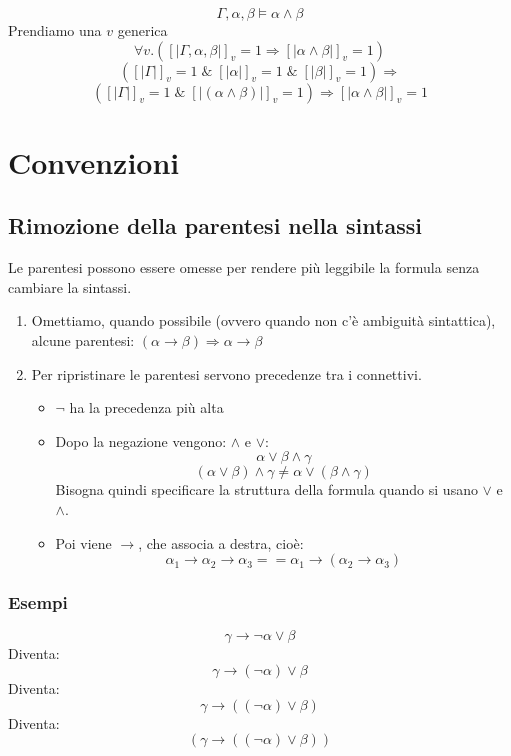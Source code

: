 \documentclass{article}
\theoremstyle{break}
\theoremstyle{break}
\theoremstyle{break}
\theoremstyle{break}
\begin{document}
\begin{exercise}
	\[
		\Gamma, \alpha, \beta \models \alpha \wedge \beta
	\]
	Prendiamo una \( v \) generica
	\[
		\forall v. ([|\Gamma, \alpha, \beta|]_v=1 \Rightarrow [|\alpha \wedge \beta|]_v=1)
	\]
	\[
		([|\Gamma|]_v=1\; \&\; [|\alpha|]_v=1\; \&\; [|\beta|]_v=1) \Rightarrow
	\]
	\[
		([|\Gamma|]_v=1\; \&\; [|(\alpha \wedge \beta)|]_v=1) \Rightarrow [|\alpha \wedge \beta|]_v=1
	\]
\end{exercise}


\section{Convenzioni}
\subsection{Rimozione della parentesi nella sintassi}
Le parentesi possono essere omesse per rendere più leggibile la formula senza cambiare
la sintassi.
\begin{enumerate}
    \item Omettiamo, quando possibile (ovvero quando non c'è ambiguità sintattica),
        alcune parentesi: \( (\alpha \to \beta) \Rightarrow \alpha \to \beta \) 
        \item Per ripristinare le parentesi servono precedenze tra i connettivi.
            \begin{itemize}
                \item \( \neg \) ha la precedenza più alta
                    \item Dopo la negazione vengono: \( \wedge \) e \( \vee \):
                        \[
                        \alpha \vee \beta \wedge \gamma
                        \] 
                        \[
                            (\alpha \vee \beta) \wedge \gamma \neq \alpha \vee (\beta \wedge \gamma)
                        \] 
                Bisogna quindi specificare la struttura della formula quando si usano \( \vee \) e \( \wedge \).
                \item Poi viene \( \to  \), che associa a destra, cioè:
                    \[
                    \alpha_1 \to \alpha_2 \to \alpha_3 == \alpha_1 \to (\alpha_2 \to \alpha_3)
                    \] 
            \end{itemize}
\end{enumerate}

\subsubsection{Esempi}
\[
\gamma \to  \neg \alpha \vee \beta 
\] 
Diventa:
\[
\gamma \to (\neg \alpha) \vee \beta
\] 
Diventa:
\[
\gamma \to ((\neg \alpha) \vee \beta)
\] 
Diventa:
\[
(\gamma \to ((\neg \alpha) \vee \beta))
\]
\end{document}
